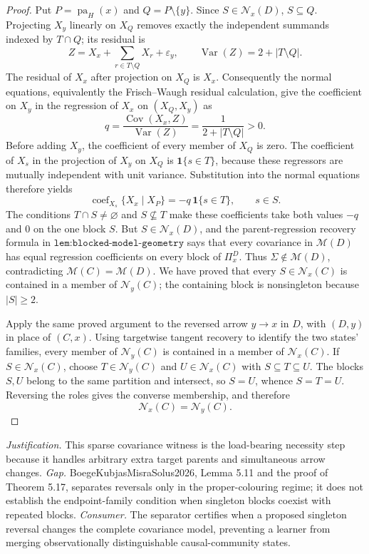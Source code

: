 \documentclass{article}
\begin{document}
\begin{proof}
Put \(P=\operatorname{pa}_H(x)\) and \(Q=P\setminus\{y\}\). Since \(S\in\mathcal N_x(D)\), \(S\subseteq Q\). Projecting \(X_y\) linearly on \(X_Q\) removes exactly the independent summands indexed by \(T\cap Q\); its residual is
\[
 Z=X_x+\sum_{r\in T\setminus Q}X_r+\varepsilon_y,
 \qquad
 \operatorname{Var}(Z)=2+|T\setminus Q|.
\]
The residual of \(X_x\) after projection on \(X_Q\) is \(X_x\). Consequently the normal equations, equivalently the Frisch--Waugh residual calculation, give the coefficient on \(X_y\) in the regression of \(X_x\) on \((X_Q,X_y)\) as
\[
 q=\frac{\operatorname{Cov}(X_x,Z)}{\operatorname{Var}(Z)}
   =\frac{1}{2+|T\setminus Q|}>0.
\]
Before adding \(X_y\), the coefficient of every member of \(X_Q\) is zero. The coefficient of \(X_s\) in the projection of \(X_y\) on \(X_Q\) is \(\mathbf 1\{s\in T\}\), because these regressors are mutually independent with unit variance. Substitution into the normal equations therefore yields
\[
 \operatorname{coef}_{X_s}\{X_x\mid X_P\}
 =-q\,\mathbf 1\{s\in T\},\qquad s\in S.
\]
The conditions \(T\cap S\neq\varnothing\) and \(S\nsubseteq T\) make these coefficients take both values \(-q\) and \(0\) on the one block \(S\). But \(S\in\mathcal N_x(D)\), and the parent-regression recovery formula in \(\texttt{lem:blocked-model-geometry}\) says that every covariance in \(\mathcal M(D)\) has equal regression coefficients on every block of \(\Pi^D_x\). Thus \(\Sigma\notin\mathcal M(D)\), contradicting \(\mathcal M(C)=\mathcal M(D)\). We have proved that every \(S\in\mathcal N_x(C)\) is contained in a member of \(\mathcal N_y(C)\); the containing block is nonsingleton because \(|S|\geq2\).

Apply the same proved argument to the reversed arrow \(y\to x\) in \(D\), with \((D,y)\) in place of \((C,x)\). Using targetwise tangent recovery to identify the two states' families, every member of \(\mathcal N_y(C)\) is contained in a member of \(\mathcal N_x(C)\). If \(S\in\mathcal N_x(C)\), choose \(T\in\mathcal N_y(C)\) and \(U\in\mathcal N_x(C)\) with \(S\subseteq T\subseteq U\). The blocks \(S,U\) belong to the same partition and intersect, so \(S=U\), whence \(S=T=U\). Reversing the roles gives the converse membership, and therefore
\[
 \mathcal N_x(C)=\mathcal N_y(C).
\]
\end{proof}
\par\smallskip\noindent \textit{Justification.} This sparse covariance witness is the load-bearing necessity step because it handles arbitrary extra target parents and simultaneous arrow changes. \textit{Gap.} BoegeKubjasMisraSolus2026, Lemma 5.11 and the proof of Theorem 5.17, separates reversals only in the proper-colouring regime; it does not establish the endpoint-family condition when singleton blocks coexist with repeated blocks. \textit{Consumer.} The separator certifies when a proposed singleton reversal changes the complete covariance model, preventing a learner from merging observationally distinguishable causal-community states.
\end{document}
